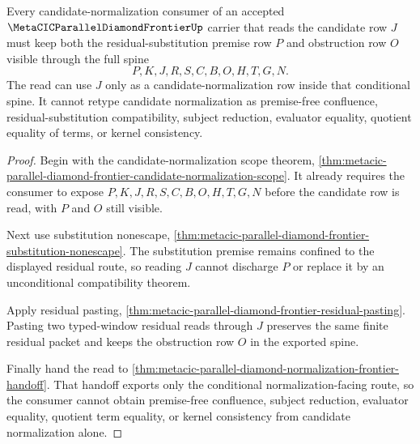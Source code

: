 \begin{theorem}
\label{thm:metacic-parallel-diamond-frontier-obstruction-retention-under-candidate-normalization}
Every candidate-normalization consumer of an accepted $\MetaCICParallelDiamondFrontierUp$ carrier that reads the candidate row $J$ must keep both the residual-substitution premise row $P$ and obstruction row $O$ visible through the full spine
$$
P,K,J,R,S,C,B,O,H,T,G,N .
$$
The read can use $J$ only as a candidate-normalization row inside that conditional spine. It cannot retype candidate normalization as premise-free confluence, residual-substitution compatibility, subject reduction, evaluator equality, quotient equality of terms, or kernel consistency.
\end{theorem}
\begin{proof}
Begin with the candidate-normalization scope theorem, \autoref{thm:metacic-parallel-diamond-frontier-candidate-normalization-scope}. It already requires the consumer to expose $P,K,J,R,S,C,B,O,H,T,G,N$ before the candidate row is read, with $P$ and $O$ still visible.

Next use substitution nonescape, \autoref{thm:metacic-parallel-diamond-frontier-substitution-nonescape}. The substitution premise remains confined to the displayed residual route, so reading $J$ cannot discharge $P$ or replace it by an unconditional compatibility theorem.

Apply residual pasting, \autoref{thm:metacic-parallel-diamond-frontier-residual-pasting}. Pasting two typed-window residual reads through $J$ preserves the same finite residual packet and keeps the obstruction row $O$ in the exported spine.

Finally hand the read to \autoref{thm:metacic-parallel-diamond-normalization-frontier-handoff}. That handoff exports only the conditional normalization-facing route, so the consumer cannot obtain premise-free confluence, subject reduction, evaluator equality, quotient term equality, or kernel consistency from candidate normalization alone.
\end{proof}


